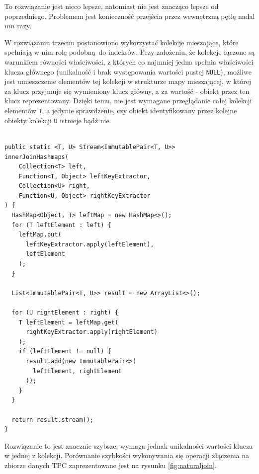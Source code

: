 \documentclass[12pt,twoside,openright]{extarticle}
\begin{document}
    To rozwiązanie jest nieco lepsze, natomiast nie jest znacząco lepsze od poprzedniego. Problemem jest konieczność przejścia przez wewnętrzną pętlę nadal $ mn $ razy.

    W rozwiązaniu trzecim postanowiono wykorzystać kolekcje mieszające, które spełniają w nim rolę podobną do indeksów. Przy założeniu, że kolekcje łączone są warunkiem równości właściwości, z których co najmniej jedna spełnia właściwości klucza głównego (unikalność i brak występowania wartości pustej \texttt{NULL}), możliwe jest umieszczenie elementów tej kolekcji w strukturze mapy mieszającej, w której za klucz przyjmuje się wymieniony klucz główny, a za wartość - obiekt przez ten klucz reprezentowany. Dzięki temu, nie jest wymagane przeglądanie całej kolekcji elementów \texttt{T}, a jedynie sprawdzenie, czy obiekt identyfikowany przez kolejne obiekty kolekcji \texttt{U} istnieje bądź nie.

\begin{lstlisting}[label=join3, caption=Rozwiązanie nr 3]

public static <T, U> Stream<ImmutablePair<T, U>> 
innerJoinHashmaps(
    Collection<T> left,
    Function<T, Object> leftKeyExtractor,
    Collection<U> right,
    Function<U, Object> rightKeyExtractor
) {
  HashMap<Object, T> leftMap = new HashMap<>();
  for (T leftElement : left) {
    leftMap.put(
      leftKeyExtractor.apply(leftElement),
      leftElement
    );
  }
  
  List<ImmutablePair<T, U>> result = new ArrayList<>();
  
  for (U rightElement : right) {
    T leftElement = leftMap.get(
      rightKeyExtractor.apply(rightElement)
    );
    if (leftElement != null) {
      result.add(new ImmutablePair<>(
        leftElement, rightElement
      ));
    }
  }
  
  return result.stream();
}
\end{lstlisting}

Rozwiązanie to jest znacznie szybsze, wymaga jednak unikalności wartości klucza w jednej z kolekcji. Porównanie szybkości wykonywania się operacji złączenia na zbiorze danych TPC zaprezentowane jest na rysunku \ref{fig:naturaljoin}.
\end{document}
